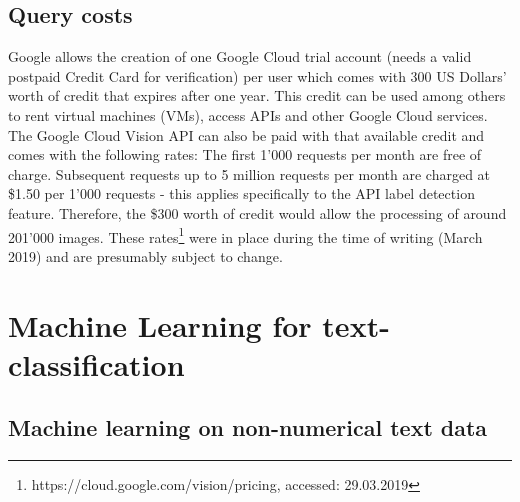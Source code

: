 \subsection{Query costs} \label{vision_query_cost}
Google allows the creation of one Google Cloud trial account (needs a valid postpaid Credit Card for verification) per user which comes with 300 US Dollars' worth of credit that expires after one year. This credit can be used among others to rent virtual machines (VMs), access APIs and other Google Cloud services. The Google Cloud Vision API can also be paid with that available credit and comes with the following rates: The first 1'000 requests per month are free of charge. Subsequent requests up to 5 million requests per month are charged at \$1.50 per 1'000 requests - this applies specifically to the API label detection feature. Therefore, the \$300 worth of credit would allow the processing of around 201'000 images. These rates\footnote{https://cloud.google.com/vision/pricing, accessed: 29.03.2019} were in place during the time of writing (March 2019) and are presumably subject to change.

\clearpage

\section{Machine Learning for text-classification} 

\subsection{Machine learning on non-numerical text data} \label{ml_text_data}

